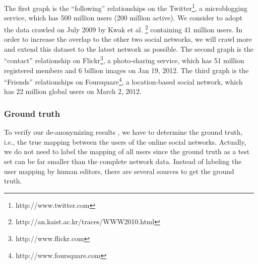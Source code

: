 \documentclass[11pt,letterpaper]{article}
\begin{document}
The first graph is the ``following'' relationships on the Twitter\footnote{http://www.twitter.com}, a microblogging service, which has 500 million users (200 million active). We consider to adopt the data crawled  on July 2009 by Kwak et al. \footnote{http://an.kaist.ac.kr/traces/WWW2010.html} containing 41 million users. In order to increase the overlap to the other two social networks, we will crawl more and extend this dataset to the latest network as possible. 
The second graph is the ``contact'' relationship on Flickr\footnote{http://www.flickr.com}, a photo-sharing service, which has 51 million registered members and 6 billion images on Jan 19, 2012.
The third graph is the ``Friends'' relationships on Foursquare\footnote{http://www.foursquare.com}, a location-based social network, which has 22 million global users on March 2, 2012. 


\subsubsection{Ground truth}

To verify our de-anonymizing results , we have to determine the ground truth, i.e., the true mapping between the users of the online social networks. Actually, we do not need to label the mapping of all users since the ground truth as a test set can be far smaller than the complete network data.
Instead of labeling the user mapping by human editors, there are several sources to get the ground truth. 
\end{document}
